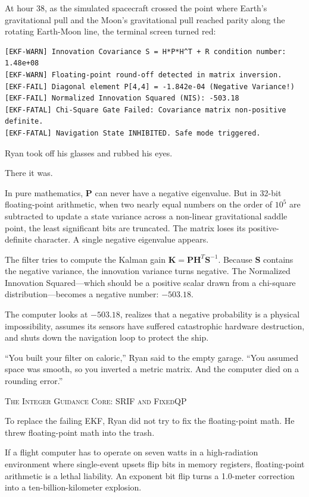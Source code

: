 \documentclass[12pt,twoside,openright]{book}
\newcommand{\sceneheader}[1]{%
  \par\vspace{1.8em}%
  {\noindent\centering\scshape\large #1\par}%
  \vspace{1.0em}%
  \noindent%
}
\newcommand{\dinkus}{%
  \par\vspace{1.2em}%
  {\noindent\centering{\large $\ast\quad\ast\quad\ast$}\par}%
  \vspace{1.2em}%
  \noindent%
}
\begin{document}
At hour 38, as the simulated spacecraft crossed the point where Earth's
gravitational pull and the Moon's gravitational pull reached parity
along the rotating Earth-Moon line, the terminal screen turned red:

\begin{lstlisting}
[EKF-WARN] Innovation Covariance S = H*P*H^T + R condition number: 1.48e+08
[EKF-WARN] Floating-point round-off detected in matrix inversion.
[EKF-FAIL] Diagonal element P[4,4] = -1.842e-04 (Negative Variance!)
[EKF-FAIL] Normalized Innovation Squared (NIS): -503.18
[EKF-FATAL] Chi-Square Gate Failed: Covariance matrix non-positive definite.
[EKF-FATAL] Navigation State INHIBITED. Safe mode triggered.
\end{lstlisting}

Ryan took off his glasses and rubbed his eyes.

There it was.

In pure mathematics, \(\mathbf{P}\) can never have a negative
eigenvalue. But in 32-bit floating-point arithmetic, when two nearly
equal numbers on the order of \(10^5\) are subtracted to update a state
variance across a non-linear gravitational saddle point, the least
significant bits are truncated. The matrix loses its positive-definite
character. A single negative eigenvalue appears.

The filter tries to compute the Kalman gain
\(\mathbf{K} = \mathbf{P} \mathbf{H}^T \mathbf{S}^{-1}\). Because
\(\mathbf{S}\) contains the negative variance, the innovation variance
turns negative. The Normalized Innovation Squared---which should be a
positive scalar drawn from a chi-square distribution---becomes a
negative number: \textbf{\(-503.18\)}.

The computer looks at \(-503.18\), realizes that a negative probability
is a physical impossibility, assumes its sensors have suffered
catastrophic hardware destruction, and shuts down the navigation loop to
protect the ship.

``You built your filter on caloric,'' Ryan said to the empty garage.
``You assumed space was smooth, so you inverted a metric matrix. And the
computer died on a rounding error.''

\dinkus

\sceneheader{The Integer Guidance Core: SRIF and
FixedQP}

To replace the failing EKF, Ryan did not try to fix the floating-point
math. He threw floating-point math into the trash.

If a flight computer has to operate on seven watts in a high-radiation
environment where single-event upsets flip bits in memory registers,
floating-point arithmetic is a lethal liability. An exponent bit flip
turns a 1.0-meter correction into a ten-billion-kilometer explosion.
\end{document}
